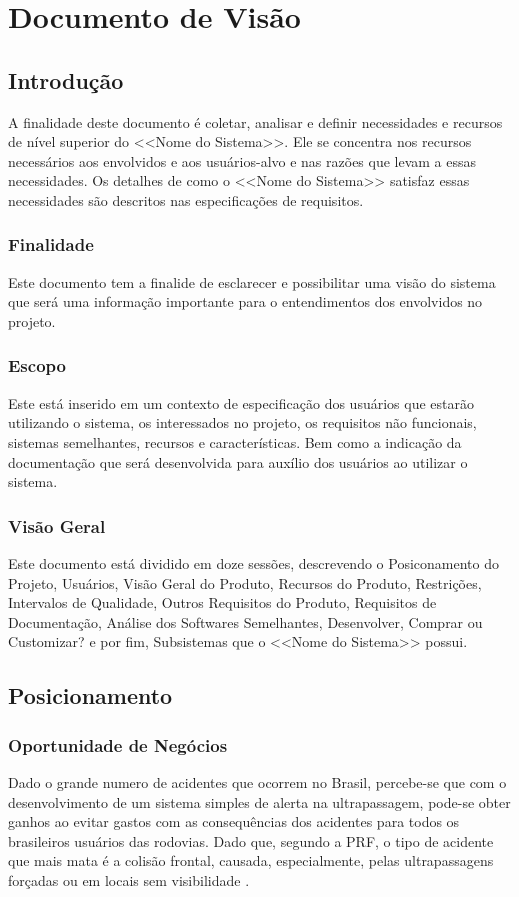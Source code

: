 \chapter[Documento de Visão]{Documento de Visão}

\section{Introdução}
A finalidade deste documento é coletar, analisar e definir necessidades e recursos de nível superior do <<Nome do Sistema>>. Ele se concentra nos recursos necessários aos envolvidos e aos usuários-alvo e nas razões que levam a essas necessidades. Os detalhes de como o <<Nome do Sistema>> satisfaz essas necessidades são descritos nas especificações de requisitos.

\subsection{Finalidade}
Este documento tem a finalide de  esclarecer e possibilitar uma visão do sistema que será uma informação importante para o entendimentos dos envolvidos no projeto.
\subsection{Escopo}
Este está inserido em um contexto de especificação dos usuários que estarão utilizando o sistema, os interessados no projeto, os requisitos não funcionais, sistemas semelhantes, recursos e características. Bem como a indicação da documentação que será desenvolvida para auxílio dos usuários ao utilizar o sistema.
\subsection{Visão Geral}
Este documento está dividido em doze sessões, descrevendo o Posiconamento do Projeto, Usuários, Visão Geral do Produto, Recursos do Produto, Restrições, Intervalos de Qualidade, Outros Requisitos do Produto, Requisitos de Documentação, Análise dos Softwares Semelhantes, Desenvolver, Comprar ou Customizar? e por fim, Subsistemas que o <<Nome do Sistema>> possui.


\section{Posicionamento}

\subsection{Oportunidade de Negócios}
Dado o grande numero de acidentes que ocorrem no Brasil, percebe-se que com o desenvolvimento de um sistema simples de alerta na ultrapassagem, pode-se obter ganhos ao evitar gastos com as consequências dos acidentes para todos os brasileiros usuários das rodovias. Dado que, segundo a PRF, o tipo de acidente que mais mata é a colisão frontal, causada, especialmente, pelas ultrapassagens forçadas ou em locais sem visibilidade \cite{prf}.

